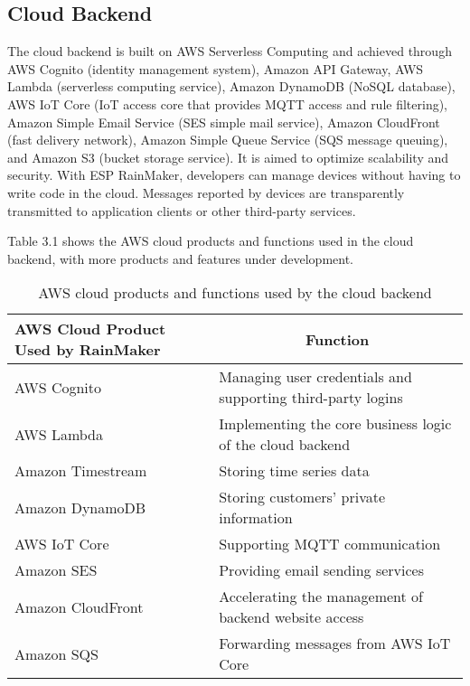 \documentclass[a4paper,12pt]{book}
\begin{document}
\subsection{Cloud Backend}
The cloud backend is built on AWS Serverless Computing and achieved through AWS Cognito (identity management system), Amazon API Gateway, AWS Lambda (serverless computing service), Amazon DynamoDB (NoSQL database), AWS IoT Core (IoT access core that provides MQTT access and rule filtering), Amazon Simple Email Service (SES simple mail service), Amazon CloudFront (fast delivery network), Amazon Simple Queue Service (SQS message queuing), and Amazon S3 (bucket storage service). It is aimed to optimize scalability and security. With ESP RainMaker, developers can manage devices without having to write code in the cloud. Messages reported by devices are transparently transmitted to application clients or other third-party services.

Table 3.1 shows the AWS cloud products and functions used in the cloud backend, with more products and features under development.

\begin{table}[h!]
    \renewcommand{\arraystretch}{1.4}
    \caption{AWS cloud products and functions used by the cloud backend}
    \begin{tabular}{|>{\centering}m{}|m{}|}
        \hline
        \rowcolor{LightBlue}\textbf{AWS Cloud Product Used by RainMaker}&\multicolumn{1}{c|}{\textbf{Function}}\\
        \hline
        AWS Cognito&Managing user credentials and supporting third-party logins\\
        \hline
        AWS Lambda&Implementing the core business logic of the cloud backend\\
        \hline
        Amazon Timestream&Storing time series data\\
        \hline
        Amazon DynamoDB&Storing customers’ private information\\
        \hline
        AWS IoT Core&Supporting MQTT communication\\
        \hline
        Amazon SES&Providing email sending services\\
        \hline
        Amazon CloudFront&Accelerating the management of backend website access\\
        \hline
        Amazon SQS&Forwarding messages from AWS IoT Core\\
        \hline
    \end{tabular}
\end{table}
\end{document}

